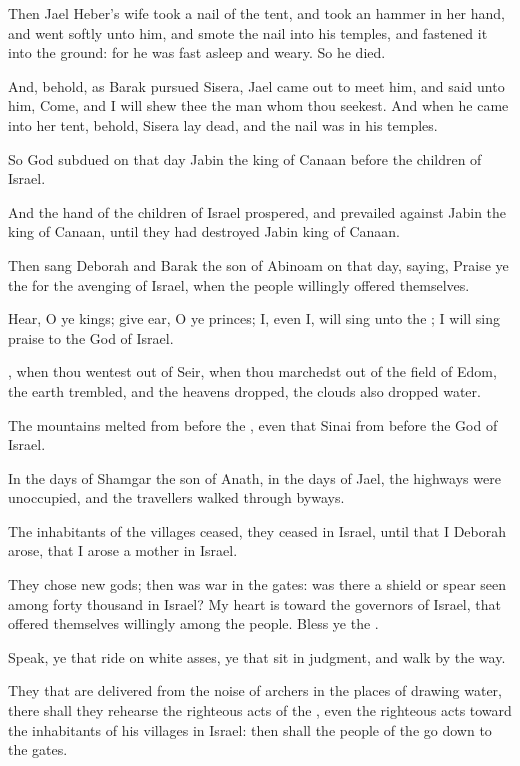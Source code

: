 \Verse Then Jael Heber's wife took a nail of the tent, and took an hammer in her hand, and went softly unto him, and smote the nail into his temples, and fastened it into the ground: for he was fast asleep and weary. So he died.

\Verse And, behold, as Barak pursued Sisera, Jael came out to meet him, and said unto him, Come, and I will shew thee the man whom thou seekest. And when he came into her tent, behold, Sisera lay dead, and the nail was in his temples.

\Verse So God subdued on that day Jabin the king of Canaan before the children of Israel.

\Verse And the hand of the children of Israel prospered, and prevailed against Jabin the king of Canaan, until they had destroyed Jabin king of Canaan.


\Chapter
\Verse Then sang Deborah and Barak the son of Abinoam on that day, saying, \Verse Praise ye the \LORD for the avenging of Israel, when the people willingly offered themselves.

\Verse Hear, O ye kings; give ear, O ye princes; I, even I, will sing unto the \LORD; I will sing praise to the \LORD God of Israel.

\Verse \LORD, when thou wentest out of Seir, when thou marchedst out of the field of Edom, the earth trembled, and the heavens dropped, the clouds also dropped water.

\Verse The mountains melted from before the \LORD, even that Sinai from before the \LORD God of Israel.

\Verse In the days of Shamgar the son of Anath, in the days of Jael, the highways were unoccupied, and the travellers walked through byways.

\Verse The inhabitants of the villages ceased, they ceased in Israel, until that I Deborah arose, that I arose a mother in Israel.

\Verse They chose new gods; then was war in the gates: was there a shield or spear seen among forty thousand in Israel?  \Verse My heart is toward the governors of Israel, that offered themselves willingly among the people. Bless ye the \LORD.

\Verse Speak, ye that ride on white asses, ye that sit in judgment, and walk by the way.

\Verse They that are delivered from the noise of archers in the places of drawing water, there shall they rehearse the righteous acts of the \LORD, even the righteous acts toward the inhabitants of his villages in Israel: then shall the people of the \LORD go down to the gates.

